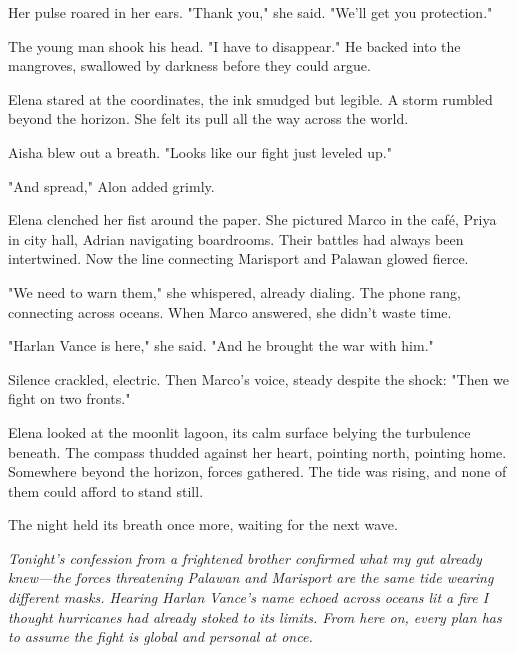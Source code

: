 Her pulse roared in her ears. "Thank you," she said. "We'll get you protection."

The young man shook his head. "I have to disappear." He backed into the mangroves, swallowed by darkness before they could argue.

Elena stared at the coordinates, the ink smudged but legible. A storm rumbled beyond the horizon. She felt its pull all the way across the world.

Aisha blew out a breath. "Looks like our fight just leveled up."

"And spread," Alon added grimly.

Elena clenched her fist around the paper. She pictured Marco in the café, Priya in city hall, Adrian navigating boardrooms. Their battles had always been intertwined. Now the line connecting Marisport and Palawan glowed fierce.

"We need to warn them," she whispered, already dialing. The phone rang, connecting across oceans. When Marco answered, she didn't waste time.

"Harlan Vance is here," she said. "And he brought the war with him."

Silence crackled, electric. Then Marco's voice, steady despite the shock: "Then we fight on two fronts."

Elena looked at the moonlit lagoon, its calm surface belying the turbulence beneath. The compass thudded against her heart, pointing north, pointing home. Somewhere beyond the horizon, forces gathered. The tide was rising, and none of them could afford to stand still.

The night held its breath once more, waiting for the next wave.

\noindent\textit{Tonight's confession from a frightened brother confirmed what my gut already knew—the forces threatening Palawan and Marisport are the same tide wearing different masks. Hearing Harlan Vance's name echoed across oceans lit a fire I thought hurricanes had already stoked to its limits. From here on, every plan has to assume the fight is global and personal at once.}
